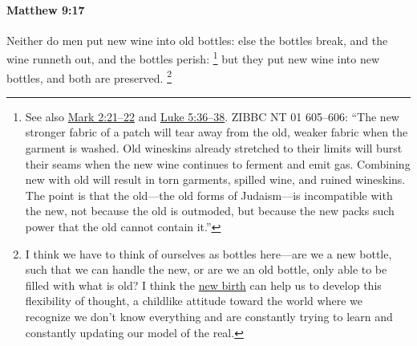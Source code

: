 		\paragraph{Matthew 9:17} %
			\label{MATTHEW-9-17}

			Neither do men put new wine into old bottles: else the bottles break, and the wine runneth out, and the bottles perish:%
				\footnote{%
					See also \hyperref[MARK-2-21]{Mark 2:21--22} and \hyperref[LUKE-5-36]{Luke 5:36--38}. ZIBBC NT 01 605--606: ``The new stronger fabric of a patch will tear away from the old, weaker fabric when the garment is washed. Old wineskins already stretched to their limits will burst their seams when the new wine continues to ferment and emit gas. Combining new with old will result in torn garments, spilled wine, and ruined wineskins. The point is that the old---the old forms of Judaism---is incompatible with the new, not because the old is outmoded, but because the new packs such power that the old cannot contain it.''
					}
			but they put new wine into new bottles, and both are preserved.%
				\footnote{%
					I think we have to think of ourselves as bottles here---are we a new bottle, such that we can handle the new, or are we an old bottle, only able to be filled with what is old? I think the \hyperref[NEWBIRTH]{new birth} can help us to develop this flexibility of thought, a childlike attitude toward the world where we recognize we don't know everything and are constantly trying to learn and constantly updating our model of the real.
					}

			\begin{framed}
			\scriptsize
				\begin{compactdesc}
					\item[SBLG] 
				\end{compactdesc}
			\end{framed}

